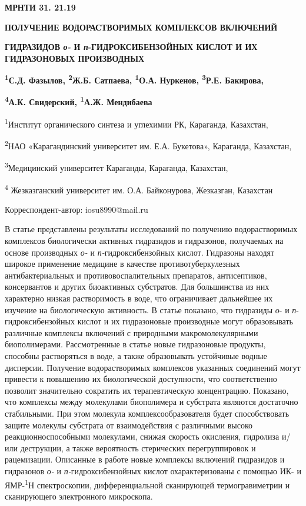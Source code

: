 \newpage
{\bfseries МРНТИ 31. 21.19}

{\bfseries ПОЛУЧЕНИЕ ВОДОРАСТВОРИМЫХ КОМПЛЕКСОВ ВКЛЮЧЕНИЙ}

{\bfseries ГИДРАЗИДОВ \emph{о-} И \emph{п}-ГИДРОКСИБЕНЗОЙНЫХ КИСЛОТ И ИХ
ГИДРАЗОНОВЫХ ПРОИЗВОДНЫХ}

{\bfseries \textsuperscript{1}С.Д. Фазылов, \textsuperscript{2}Ж.Б.
Сатпаева, \textsuperscript{1}О.А. Нуркенов, \textsuperscript{3}Р.Е.
Бакирова,}

{\bfseries \textsuperscript{4}А.К. Свидерский, \textsuperscript{1}А.Ж.
Мендибаева}

\textsuperscript{1}Институт органического синтеза и углехимии РК,
Караганда, Казахстан,

\textsuperscript{2}НАО «Карагандинский университет им. Е.А. Букетова»,
Караганда, Казахстан,

\textsuperscript{3}Медицинский университет Караганды, Караганда,
Казахстан,

\textsuperscript{4} Жезказганский университет им. О.А. Байконурова,
Жезказган, Казахстан

Корреспондент-автор: iosu8990@mail.ru

В статье представлены результаты исследований по получению
водорастворимых комплексов биологически активных гидразидов и
гидразонов, получаемых на основе производных \emph{о-} и
\emph{п-}гидроксибензойных кислот. Гидразоны находят широкое применение
медицине в качестве противотуберкулезных антибактериальных и
противовоспалительных препаратов, антисептиков, консервантов и других
биоактивных субстратов. Для большинства из них характерно низкая
растворимость в воде, что ограничивает дальнейшее их изучение на
биологическую активность. В статье показано, что гидразиды \emph{о}- и
\emph{п}- гидроксибензойных кислот и их гидразоновые производные могут
образовывать различные комплексы включений с природными
макромолекулярными биополимерами. Рассмотренные в статье новые
гидразоновые продукты, способны растворяться в воде, а также
образовывать устойчивые водные дисперсии. Получение водорастворимых
комплексов указанных соединений могут привести к повышению их
биологической доступности, что соответственно позволит значительно
сократить их терапевтическую концентрацию. Показано, что комплексы между
молекулами биополимера и субстрата являются достаточно стабильными. При
этом молекула комплексообразователя будет способствовать защите молекулы
субстрата от взаимодействия с различными высоко реакционноспособными
молекулами, снижая скорость окисления, гидролиза и/или деструкции, а
также вероятность стерических перегруппировок и рацемизации. Описанные в
работе новые комплексы включений гидразидов и гидразонов \emph{о-} и
\emph{п-}гидроксибензойных кислот охарактеризованы с помощью ИК- и
ЯМР-\textsuperscript{1}Н спектроскопии, дифференциальной сканирующей
термогравиметрии и сканирующего электронного микроскопа.

